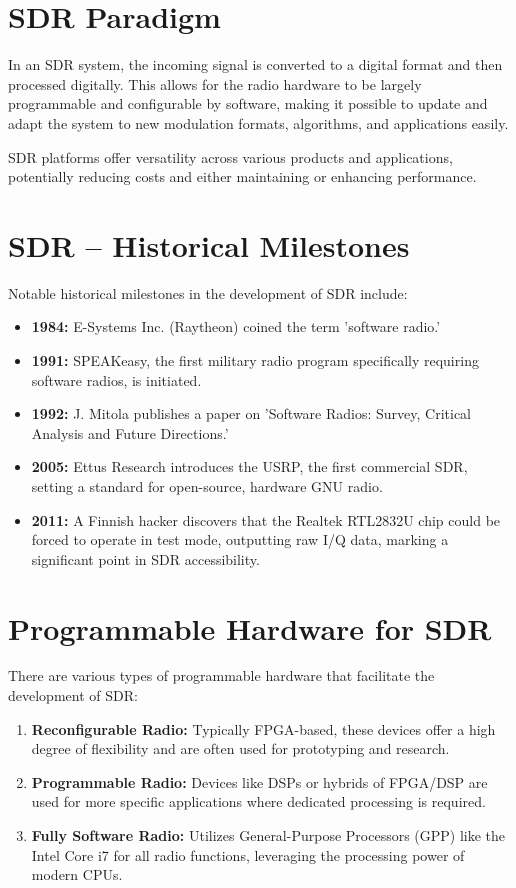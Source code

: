 \section*{SDR Paradigm}

In an SDR system, the incoming signal is converted to a digital format and then processed digitally. This allows for the radio hardware to be largely programmable and configurable by software, making it possible to update and adapt the system to new modulation formats, algorithms, and applications easily.

SDR platforms offer versatility across various products and applications, potentially reducing costs and either maintaining or enhancing performance.

\section*{SDR – Historical Milestones}

Notable historical milestones in the development of SDR include:
\begin{itemize}
    \item \textbf{1984:} E-Systems Inc. (Raytheon) coined the term 'software radio.'
    \item \textbf{1991:} SPEAKeasy, the first military radio program specifically requiring software radios, is initiated.
    \item \textbf{1992:} J. Mitola publishes a paper on 'Software Radios: Survey, Critical Analysis and Future Directions.'
    \item \textbf{2005:} Ettus Research introduces the USRP, the first commercial SDR, setting a standard for open-source, hardware GNU radio.
    \item \textbf{2011:} A Finnish hacker discovers that the Realtek RTL2832U chip could be forced to operate in test mode, outputting raw I/Q data, marking a significant point in SDR accessibility.
\end{itemize}


\section*{Programmable Hardware for SDR}

There are various types of programmable hardware that facilitate the development of SDR:
\begin{enumerate}
    \item \textbf{Reconfigurable Radio:} Typically FPGA-based, these devices offer a high degree of flexibility and are often used for prototyping and research.
    \item \textbf{Programmable Radio:} Devices like DSPs or hybrids of FPGA/DSP are used for more specific applications where dedicated processing is required.
    \item \textbf{Fully Software Radio:} Utilizes General-Purpose Processors (GPP) like the Intel Core i7 for all radio functions, leveraging the processing power of modern CPUs.
\end{enumerate}

